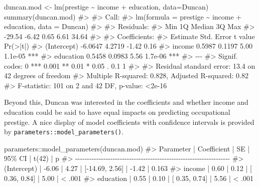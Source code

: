\documentclass[
  letterpaper,
  10pt,
  krantz2]{krantz}
\makeatletter
\newenvironment{Shaded}{\begin{snugshade}}{\end{snugshade}}
\newcommand{\AttributeTok}[1]{\textcolor[rgb]{0.40,0.45,0.13}{#1}}
\newcommand{\CommentTok}[1]{\textcolor[rgb]{0.37,0.37,0.37}{#1}}
\newcommand{\FunctionTok}[1]{\textcolor[rgb]{0.28,0.35,0.67}{#1}}
\newcommand{\NormalTok}[1]{\textcolor[rgb]{0.00,0.23,0.31}{#1}}
\newcommand{\OtherTok}[1]{\textcolor[rgb]{0.00,0.23,0.31}{#1}}
\newcommand{\SpecialCharTok}[1]{\textcolor[rgb]{0.37,0.37,0.37}{#1}}
\newenvironment{kframe}{%
  \medskip{}
  \setlength{\fboxsep}{.8em}
  \def\at@end@of@kframe{}%
  \ifinner\ifhmode%
  \def\at@end@of@kframe{\end{minipage}}%
  \begin{minipage}{\columnwidth}%
  \fi\fi%
  \def\FrameCommand##1{\hskip\@totalleftmargin \hskip-\fboxsep
  \colorbox{shadecolor}{##1}\hskip-\fboxsep
      \hskip-\linewidth \hskip-\@totalleftmargin \hskip\columnwidth}%
  \MakeFramed {\advance\hsize-\width
    \@totalleftmargin\z@ \linewidth\hsize
    \@setminipage}}%
{\par\unskip\endMakeFramed%
  \at@end@of@kframe}
\renewenvironment{Shaded}{\begin{kframe}}{\end{kframe}}
\makeatother
\begin{document}
\begin{Shaded}
\begin{Highlighting}[]
\NormalTok{duncan.mod }\OtherTok{\textless{}{-}} \FunctionTok{lm}\NormalTok{(prestige }\SpecialCharTok{\textasciitilde{}}\NormalTok{ income }\SpecialCharTok{+}\NormalTok{ education, }\AttributeTok{data=}\NormalTok{Duncan)}
\FunctionTok{summary}\NormalTok{(duncan.mod)}
\CommentTok{\#\textgreater{} }
\CommentTok{\#\textgreater{} Call:}
\CommentTok{\#\textgreater{} lm(formula = prestige \textasciitilde{} income + education, data = Duncan)}
\CommentTok{\#\textgreater{} }
\CommentTok{\#\textgreater{} Residuals:}
\CommentTok{\#\textgreater{}    Min     1Q Median     3Q    Max }
\CommentTok{\#\textgreater{} {-}29.54  {-}6.42   0.65   6.61  34.64 }
\CommentTok{\#\textgreater{} }
\CommentTok{\#\textgreater{} Coefficients:}
\CommentTok{\#\textgreater{}             Estimate Std. Error t value Pr(\textgreater{}|t|)    }
\CommentTok{\#\textgreater{} (Intercept)  {-}6.0647     4.2719   {-}1.42     0.16    }
\CommentTok{\#\textgreater{} income        0.5987     0.1197    5.00  1.1e{-}05 ***}
\CommentTok{\#\textgreater{} education     0.5458     0.0983    5.56  1.7e{-}06 ***}
\CommentTok{\#\textgreater{} {-}{-}{-}}
\CommentTok{\#\textgreater{} Signif. codes:  0 \textquotesingle{}***\textquotesingle{} 0.001 \textquotesingle{}**\textquotesingle{} 0.01 \textquotesingle{}*\textquotesingle{} 0.05 \textquotesingle{}.\textquotesingle{} 0.1 \textquotesingle{} \textquotesingle{} 1}
\CommentTok{\#\textgreater{} }
\CommentTok{\#\textgreater{} Residual standard error: 13.4 on 42 degrees of freedom}
\CommentTok{\#\textgreater{} Multiple R{-}squared:  0.828,  Adjusted R{-}squared:  0.82 }
\CommentTok{\#\textgreater{} F{-}statistic:  101 on 2 and 42 DF,  p{-}value: \textless{}2e{-}16}
\end{Highlighting}
\end{Shaded}

Beyond this, Duncan was interested in the coefficients and whether
income and education could be said to have equal impacts on predicting
occupational prestige. A nice display of model coefficients with
confidence intervals is provided by
\texttt{parameters::model\_parameters()}.

\begin{Shaded}
\begin{Highlighting}[]
\NormalTok{parameters}\SpecialCharTok{::}\FunctionTok{model\_parameters}\NormalTok{(duncan.mod)}
\CommentTok{\#\textgreater{} Parameter   | Coefficient |   SE |         95\% CI | t(42) |      p}
\CommentTok{\#\textgreater{} {-}{-}{-}{-}{-}{-}{-}{-}{-}{-}{-}{-}{-}{-}{-}{-}{-}{-}{-}{-}{-}{-}{-}{-}{-}{-}{-}{-}{-}{-}{-}{-}{-}{-}{-}{-}{-}{-}{-}{-}{-}{-}{-}{-}{-}{-}{-}{-}{-}{-}{-}{-}{-}{-}{-}{-}{-}{-}{-}{-}{-}{-}{-}{-}{-}{-}}
\CommentTok{\#\textgreater{} (Intercept) |       {-}6.06 | 4.27 | [{-}14.69, 2.56] | {-}1.42 | 0.163 }
\CommentTok{\#\textgreater{} income      |        0.60 | 0.12 | [  0.36, 0.84] |  5.00 | \textless{} .001}
\CommentTok{\#\textgreater{} education   |        0.55 | 0.10 | [  0.35, 0.74] |  5.56 | \textless{} .001}
\end{Highlighting}
\end{Shaded}
\end{document}
